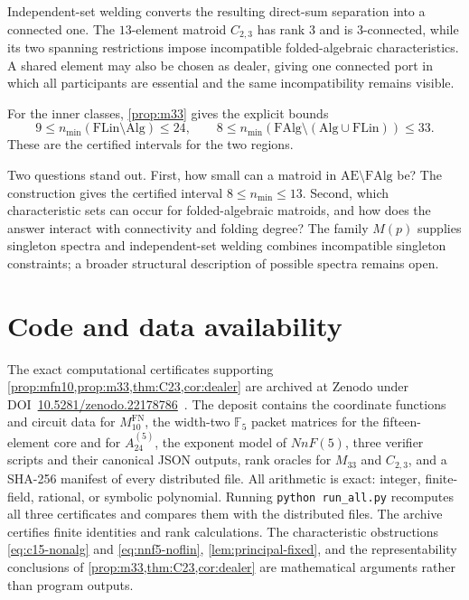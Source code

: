 \documentclass[11pt]{article}
\theoremstyle{definition}
\newcommand{\FAlg}{\mathrm{FAlg}}
\newcommand{\FLin}{\mathrm{FLin}}
\newcommand{\Alg}{\mathrm{Alg}}
\newcommand{\AlmostEnt}{\mathrm{AE}}
\begin{document}
Independent-set welding converts the resulting direct-sum separation into a connected one.  The $13$-element matroid $C_{2,3}$ has rank $3$ and is $3$-connected, while its two spanning restrictions impose incompatible folded-algebraic characteristics.  A shared element may also be chosen as dealer, giving one connected port in which all participants are essential and the same incompatibility remains visible.

For the inner classes, \cref{prop:m33} gives the explicit bounds
\[
9\le n_{\min}(\FLin\setminus\Alg)\le24,
\qquad
8\le n_{\min}(\FAlg\setminus(\Alg\cup\FLin))\le33.
\]
These are the certified intervals for the two regions.

Two questions stand out.  First, how small can a matroid in $\AlmostEnt\setminus\FAlg$ be?  The construction gives the certified interval $8\le n_{\min}\le13$.  Second, which characteristic sets can occur for folded-algebraic matroids, and how does the answer interact with connectivity and folding degree?  The family $M(p)$ supplies singleton spectra and independent-set welding combines incompatible singleton constraints; a broader structural description of possible spectra remains open.

\section*{Code and data availability}

The exact computational certificates supporting \cref{prop:mfn10,prop:m33,thm:C23,cor:dealer} are archived at Zenodo under DOI~\href{https://doi.org/10.5281/zenodo.22178786}{10.5281/zenodo.22178786}~\cite{KhazaeiCompanion2026}.  The deposit contains the coordinate functions and circuit data for $M^{\mathrm{FN}}_{10}$, the width-two $\mathbb F_5$ packet matrices for the fifteen-element core and for $A_{24}^{(5)}$, the exponent model of $NnF(5)$, three verifier scripts and their canonical JSON outputs, rank oracles for $M_{33}$ and $C_{2,3}$, and a SHA-256 manifest of every distributed file.  All arithmetic is exact: integer, finite-field, rational, or symbolic polynomial.  Running \texttt{python run\_all.py} recomputes all three certificates and compares them with the distributed files.  The archive certifies finite identities and rank calculations.  The characteristic obstructions \eqref{eq:c15-nonalg} and \eqref{eq:nnf5-noflin}, \cref{lem:principal-fixed}, and the representability conclusions of \cref{prop:m33,thm:C23,cor:dealer} are mathematical arguments rather than program outputs.
\end{document}
